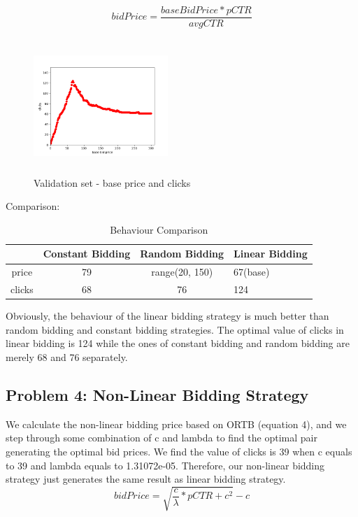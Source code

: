 \documentclass{sig-alternate-05-2015}
\begin{document}
\begin{equation}bidPrice=\frac{baseBidPrice*pCTR}{avgCTR}\end{equation}

\begin{figure}
\centering
\includegraphics[height=2in, width=2in]{images/base_bid_price.png}
\caption{Validation set - base price and clicks}
\end{figure}

Comparison:
\begin{table}
\centering
\caption{Behaviour Comparison}
\begin{tabular}{|c|c|c|l|} \hline
&Constant Bidding&Random Bidding&Linear Bidding\\ \hline
price&79&range(20, 150)&67(base)\\ \hline
clicks&68& 76&124\\
\hline\end{tabular}
\end{table}

Obviously, the behaviour of the linear bidding strategy is much better than random bidding and constant bidding strategies. The optimal value of clicks in linear bidding is 124 while the ones of constant bidding and random bidding are merely 68 and 76 separately.

\subsection{Problem 4: Non-Linear Bidding Strategy}
We calculate the non-linear bidding price based on ORTB (equation 4), and we step through some combination of c and lambda to find the optimal pair generating the optimal bid prices. We find the value of clicks is 39 when c equals to 39 and lambda equals to 1.31072e-05. Therefore, our non-linear bidding strategy just generates the same result as linear bidding strategy.
\begin{equation}bidPrice=\sqrt{\frac{c}{\lambda} * pCTR + c^2} - c\end{equation}
\end{document}

